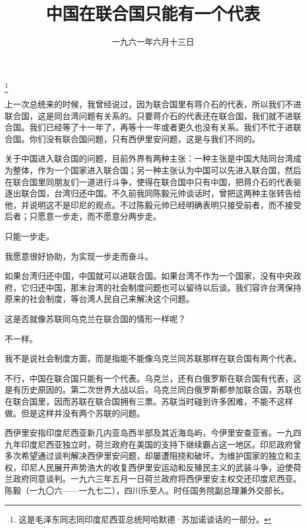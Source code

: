 
\title{中国在联合国只能有一个代表}
\date{一九六一年六月十三日}
\thanks{这是毛泽东同志同印度尼西亚总统阿哈默德·苏加诺谈话的一部分。}
\maketitle


上一次总统来的时候，我曾经说过，因为联合国里有蒋介石的代表，所以我们不进联合国，这是同台湾问题有关系的。只要蒋介石的代表还在联合国，我们就不进联合国。我们已经等了十一年了，再等十一年或者更久也没有关系。我们不忙于进联合国。你们没有联合国问题，只有西伊里安问题，这是与我们不同的。

关于中国进入联合国的问题，目前外界有两种主张：一种主张是中国大陆同台湾成为整体，作为一个国家进入联合国；另一种主张认为中国可以先进入联合国，然后在联合国里同朋友们一道进行斗争，使得在联合国中只有中国，把蒋介石的代表驱逐出联合国，台湾归还中国。不久前我同陈毅元帅谈话时，曾把这两种主张转告给他，并说明这不是印尼的观点。不过陈毅元帅已经明确表明只接受前者，而不接受后者；只愿意一步走，而不愿意分两步走。

只能一步走。

我愿意很好协助，为实现一步走而奋斗。

如果台湾归还中国，中国就可以进联合国。如果台湾不作为一个国家，没有中央政府，它归还中国，那末台湾的社会制度问题也可以留待以后谈。我们容许台湾保持原来的社会制度，等台湾人民自己来解决这个问题。

这是否就像苏联同乌克兰在联合国的情形一样呢？

不一样。

我不是说社会制度方面，而是指能不能像乌克兰同苏联那样在联合国有两个代表。

不行，中国在联合国只能有一个代表。乌克兰，还有白俄罗斯在联合国有代表，这是有历史原因的。第二次世界大战以后，乌克兰同白俄罗斯都参加联合国，苏联也在联合国里，因而苏联在联合国拥有三票。苏联当时碰到许多困难，不能不这样做。但是这样并没有两个苏联的问题。

\begin{maonote}
西伊里安指印度尼西亚新几内亚岛西半部及其近海岛屿，今伊里安查亚省。一九四九年印度尼西亚独立时，荷兰政府在美国的支持下继续霸占这一地区。印尼政府曾多次希望通过谈判解决西伊里安问题，却屡遭阻挠和破坏。为维护国家的独立和主权，印尼人民展开声势浩大的收复西伊里安运动和反殖民主义的武装斗争，迫使荷兰政府同意谈判。一九六三年五月一日荷兰政府将西伊里安主权交还印度尼西亚。
陈毅（一九〇六——一九七二），四川乐至人。时任国务院副总理兼外交部长。
\end{maonote}
